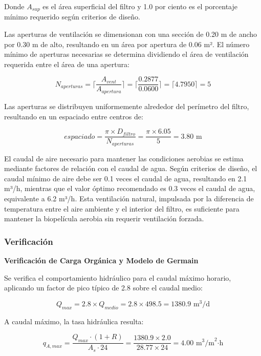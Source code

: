 \documentclass[12pt,a4paper]{article}
\begin{document}
Donde $A_{sup}$ es el área superficial del filtro y 1.0 por ciento es el porcentaje mínimo requerido según criterios de diseño.

Las aperturas de ventilación se dimensionan con una sección de 0.20 m de ancho por 0.30 m de alto, resultando en un área por apertura de 0.06 m². El número mínimo de aperturas necesarias se determina dividiendo el área de ventilación requerida entre el área de una apertura:

\begin{equation}
N_{aperturas} = \lceil\frac{A_{vent}}{A_{apertura}}\rceil = \lceil\frac{0.2877}{0.0600}\rceil = \lceil4.7950\rceil = 5
\end{equation}

Las aperturas se distribuyen uniformemente alrededor del perímetro del filtro, resultando en un espaciado entre centros de:

\begin{equation}
espaciado = \frac{\pi \times D_{filtro}}{N_{aperturas}} = \frac{\pi \times 6.05}{5} = 3.80 \text{ m}
\end{equation}

El caudal de aire necesario para mantener las condiciones aerobias se estima mediante factores de relación con el caudal de agua. Según criterios de diseño, el caudal mínimo de aire debe ser 0.1 veces el caudal de agua, resultando en 2.1 m³/h, mientras que el valor óptimo recomendado es 0.3 veces el caudal de agua, equivalente a 6.2 m³/h. Esta ventilación natural, impulsada por la diferencia de temperatura entre el aire ambiente y el interior del filtro, es suficiente para mantener la biopelícula aerobia sin requerir ventilación forzada.

\subsubsection{Verificación}

\textbf{Verificación de Carga Orgánica y Modelo de Germain}

Se verifica el comportamiento hidráulico para el caudal máximo horario, aplicando un factor de pico típico de 2.8 sobre el caudal medio:

\begin{equation}
Q_{max} = 2.8 \times Q_{medio} = 2.8 \times 498.5 = 1380.9 \text{ m}^3\text{/d}
\end{equation}

A caudal máximo, la tasa hidráulica resulta:

\begin{equation}
q_{A,max} = \frac{Q_{max} \cdot (1 + R)}{A_s \cdot 24} = \frac{1380.9 \times 2.0}{28.77 \times 24} = 4.00 \text{ m}^3\text{/m}^2\text{·h}
\end{equation}
\end{document}
